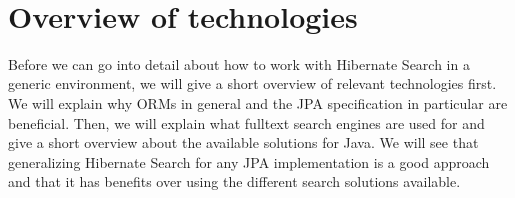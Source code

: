 ~
\pagebreak

\section{Overview of technologies}\label{Overview}
Before we can go into detail about how to work with Hibernate Search in a generic environment, we will give a short overview of relevant technologies first. We will explain why ORMs in general and the JPA specification in particular are beneficial. Then, we will explain what fulltext search engines are used for and give a short overview about the available solutions for Java. We will see that generalizing Hibernate Search for any JPA implementation is a good approach and that it has benefits over using the different search solutions available.

